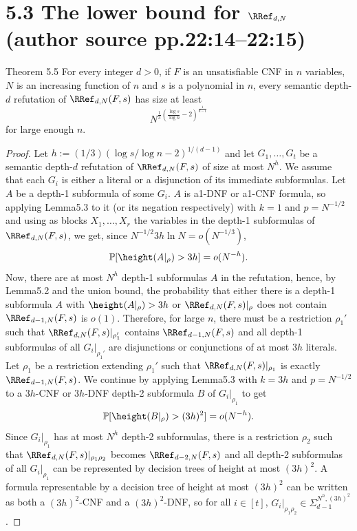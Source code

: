 \section*{5.3 The lower bound for $\RRef_{d,N}$ (author source pp.22:14--22:15)}
\begin{originalresult}{Theorem 5.5}
For every integer $d>0$, if $F$ is an unsatisfiable CNF in $n$ variables,$N$ is an increasing function of $n$ and $s$ is a polynomial in $n$, every semantic depth-$d$ refutation of $\RRef_{d,N}(F,s)$ has size at least
\[N^{\frac13\left(\frac{\log s}{\log n}-2\right)^{\frac1{d-1}}}\]
for large enough $n$.
\end{originalresult}
\begin{proof}
Let $h:=(1/3)(\log s/\log n-2)^{1/(d-1)}$ and let $G_1,\ldots,G_t$ be a semantic depth-$d$ refutation of $\RRef_{d,N}(F,s)$ of size at most $N^h$. We assume that each $G_i$ is either a literal or a disjunction of its immediate subformulas. Let $A$ be a depth-1 subformula of some $G_i$. $A$ is a1-DNF or a1-CNF formula, so applying Lemma5.3 to it (or its negation respectively) with $k=1$ and $p=N^{-1/2}$ and using as blocks $X_1,\ldots,X_r$ the variables in the depth-1 subformulas of $\RRef_{d,N}(F,s)$, we get, since $N^{-1/2}3h\ln N=o(N^{-1/3})$,
\[\mathbb P[\height(A|_\rho)>3h]=o(N^{-h}).\]
Now, there are at most $N^h$ depth-1 subformulas $A$ in the refutation, hence, by Lemma5.2 and the union bound, the probability that either there is a depth-1 subformula $A$ with $\height(A|_\rho)>3h$ or $\RRef_{d,N}(F,s)|_\rho$ does not contain $\RRef_{d-1,N}(F,s)$ is $o(1)$. Therefore, for large $n$, there must be a restriction $\rho_1'$ such that $\RRef_{d,N}(F,s)|_{\rho_1'}$ contains $\RRef_{d-1,N}(F,s)$ and all depth-1 subformulas of all $G_i|_{\rho_1'}$ are disjunctions or conjunctions of at most $3h$ literals. Let $\rho_1$ be a restriction extending $\rho_1'$ such that $\RRef_{d,N}(F,s)|_{\rho_1}$ is exactly $\RRef_{d-1,N}(F,s)$.
We continue by applying Lemma5.3 with $k=3h$ and $p=N^{-1/2}$ to a $3h$-CNF or $3h$-DNF depth-2 subformula $B$ of $G_i|_{\rho_1}$ to get
\[\mathbb P[\height(B|_\rho)>(3h)^2]=o(N^{-h}).\]
Since $G_i|_{\rho_1}$ has at most $N^h$ depth-2 subformulas, there is a restriction $\rho_2$ such that $\RRef_{d,N}(F,s)|_{\rho_1\rho_2}$ becomes $\RRef_{d-2,N}(F,s)$ and all depth-2 subformulas of all $G_i|_{\rho_1}$ can be represented by decision trees of height at most $(3h)^2$. A formula representable by a decision tree of height at most $(3h)^2$ can be written as both a $(3h)^2$-CNF and a $(3h)^2$-DNF, so for all $i\in[t]$, $G_i|_{\rho_1\rho_2}\in\Sigma_{d-1}^{N^h,(3h)^2}$.

\end{proof}
